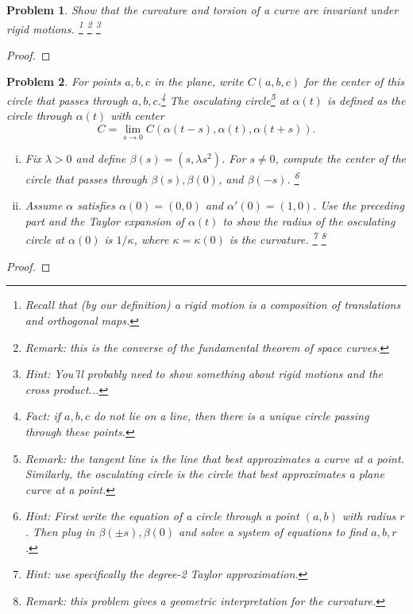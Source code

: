 \documentclass[11pt]{article}
\newtheorem{problem}{Problem}
\begin{document}
\pagebreak

\begin{problem}
Show that the curvature and torsion of a curve are invariant under rigid motions. \footnote{Recall that (by our definition) a rigid motion is a composition of translations and orthogonal maps.} \footnote{Remark: this is the converse of the fundamental theorem of space curves.} \footnote{Hint: You'll probably need to show something about rigid motions and the cross product...}
\end{problem}

\begin{proof}

\end{proof}

\pagebreak

\begin{problem}For points $a,b,c$ in the plane, write $C(a,b,c)$ for the center of this circle that passes through $a,b,c$.\footnote{Fact: if $a,b,c$ do not lie on a line, then there is a unique circle passing through these points.} The osculating circle\footnote{Remark: the tangent line is the line that best approximates a curve at a point. Similarly, the osculating circle is the circle that best approximates a plane curve at a point.}  at $\alpha(t)$ is defined as the circle through $\alpha(t)$ with center 
\[C=\lim_{s\to0} C(\alpha(t-s),\alpha(t),\alpha(t+s)).\]
\begin{enumerate}[(i)]
\item Fix $\lambda>0$ and define $\beta(s)=(s,\lambda s^2)$. For $s\neq0$, compute the center of the circle that passes through $\beta(s),\beta(0)$, and $\beta(-s)$.  \footnote{Hint: First write the equation of a circle through a point $(a,b)$ with radius $r$. Then plug in $\beta(\pm s),\beta(0)$ and solve a system of equations to find $a,b,r$.}
\item Assume $\alpha$ satisfies $\alpha(0)=(0,0)$ and $\alpha'(0)=(1,0)$. Use the preceding part and the Taylor expansion of $\alpha(t)$ to show the radius of the osculating circle at $\alpha(0)$ is $1/\kappa$, where $\kappa=\kappa(0)$ is the curvature. \footnote{Hint: use specifically the degree-2 Taylor approximation.} \footnote{Remark: this problem gives a geometric interpretation for the curvature. }
\end{enumerate} 
\end{problem}

\begin{proof}

\end{proof}
\end{document}
